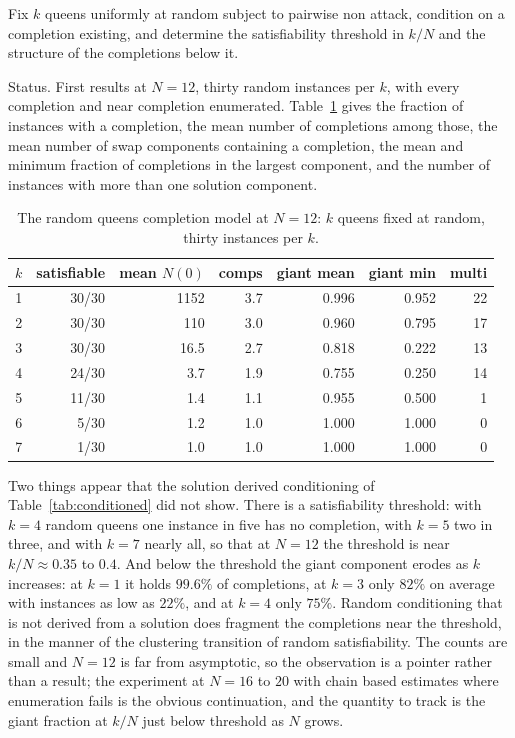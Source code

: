\begin{problem}
Fix $k$ queens uniformly at random subject to pairwise non attack, condition on a completion existing, and determine the satisfiability threshold in $k/N$ and the structure of the completions below it.
\end{problem}

Status. First results at $N = 12$, thirty random instances per $k$, with every completion and near completion enumerated. Table~\ref{tab:randomcompletion} gives the fraction of instances with a completion, the mean number of completions among those, the mean number of swap components containing a completion, the mean and minimum fraction of completions in the largest component, and the number of instances with more than one solution component.

\begin{table}[t]
\centering
\small
\caption{The random queens completion model at $N = 12$: $k$ queens fixed at random, thirty instances per $k$.}
\label{tab:randomcompletion}
\begin{tabular}{rrrrrrr}
\toprule
$k$ & satisfiable & mean $N(0)$ & comps & giant mean & giant min & multi \\
\midrule
1 & 30/30 & 1152 & 3.7 & 0.996 & 0.952 & 22 \\
2 & 30/30 & 110 & 3.0 & 0.960 & 0.795 & 17 \\
3 & 30/30 & 16.5 & 2.7 & 0.818 & 0.222 & 13 \\
4 & 24/30 & 3.7 & 1.9 & 0.755 & 0.250 & 14 \\
5 & 11/30 & 1.4 & 1.1 & 0.955 & 0.500 & 1 \\
6 & 5/30 & 1.2 & 1.0 & 1.000 & 1.000 & 0 \\
7 & 1/30 & 1.0 & 1.0 & 1.000 & 1.000 & 0 \\
\bottomrule
\end{tabular}
\end{table}

Two things appear that the solution derived conditioning of Table~\ref{tab:conditioned} did not show. There is a satisfiability threshold: with $k = 4$ random queens one instance in five has no completion, with $k = 5$ two in three, and with $k = 7$ nearly all, so that at $N = 12$ the threshold is near $k / N \approx 0.35$ to $0.4$. And below the threshold the giant component erodes as $k$ increases: at $k = 1$ it holds $99.6\%$ of completions, at $k = 3$ only $82\%$ on average with instances as low as $22\%$, and at $k = 4$ only $75\%$. Random conditioning that is not derived from a solution does fragment the completions near the threshold, in the manner of the clustering transition of random satisfiability. The counts are small and $N = 12$ is far from asymptotic, so the observation is a pointer rather than a result; the experiment at $N = 16$ to $20$ with chain based estimates where enumeration fails is the obvious continuation, and the quantity to track is the giant fraction at $k / N$ just below threshold as $N$ grows.

